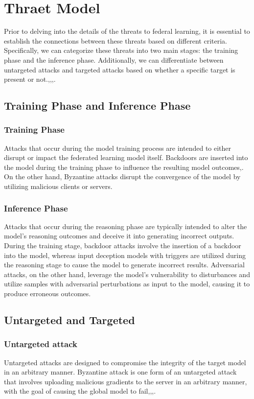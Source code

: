 \documentclass[conference]{IEEEtran}
\begin{document}
\section{Thraet Model}
Prior to delving into the details of the threats to federal learning, it is essential
to establish the connections between these threats based on different criteria. 
Specifically, we can categorize these threats into two main stages: 
the training phase and the inference phase. Additionally, we can 
differentiate between untargeted attacks and targeted attacks based 
on whether a specific target is present or not.\cite{b38},\cite{b39},\cite{b40},\cite{b41}.  

\subsection{Training Phase and Inference Phase}  
\subsubsection{Training Phase}Attacks that occur during the model training process are 
intended to either disrupt or impact the federated learning model itself. Backdoors are 
inserted into the model during the training phase to influence the resulting model outcomes\cite{b45},\cite{b46}. 
On the other hand, Byzantine attacks disrupt the convergence of the model by utilizing malicious 
clients or servers\cite{b29}.  
\subsubsection{Inference Phase}Attacks that occur during the reasoning phase are 
typically intended to alter the model's reasoning outcomes and deceive it 
into generating incorrect outputs\cite{b47}. During the training stage, backdoor 
attacks involve the insertion of a backdoor into the model, whereas 
input deception models with triggers are utilized during the 
reasoning stage to cause the model to generate incorrect results. 
Adversarial attacks, on the other hand, leverage the model's vulnerability 
to disturbances and utilize samples with adversarial perturbations as input 
to the model, causing it to produce erroneous outcomes.  

\subsection{Untargeted and Targeted}  
\subsubsection{Untargeted attack}Untargeted attacks are designed to compromise 
the integrity of the target model in an arbitrary manner.
Byzantine attack is one form of an untargeted attack that involves 
uploading malicious gradients to the server in an arbitrary manner, 
with the goal of causing the global model to fail\cite{b48},\cite{b49},\cite{b50},\cite{b51}.
\end{document}
